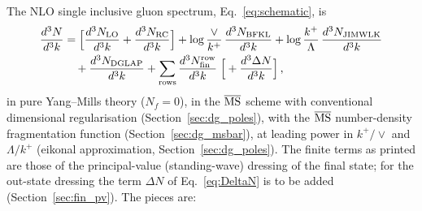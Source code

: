The NLO single inclusive gluon spectrum, Eq.~\eqref{eq:schematic}, is
\begin{align}\label{eq:result}
\frac{d^3N}{d^3k}&=\Big[\frac{d^3N_{\rm LO}}{d^3k}+\frac{d^3N_{\rm RC}}{d^3k}\Big]+\log\frac{\vee}{k^+}\,\frac{d^3N_{\rm BFKL}}{d^3k}+\log\frac{k^+}{\Lambda}\,\frac{d^3N_{\rm JIMWLK}}{d^3k}\notag\\
&\quad+\frac{d^3N_{\rm DGLAP}}{d^3k}+\sum_{\rm rows}\frac{d^3N^{\rm row}_{\rm fin}}{d^3k}\;\Big[+\frac{d^3\Delta N}{d^3k}\Big]\,,
\end{align}
in pure Yang--Mills theory ($N_f=0$), in the $\overline{\rm MS}$ scheme with conventional dimensional regularisation (Section~\ref{sec:dg_poles}), with the $\overline{\rm MS}$ number-density fragmentation function (Section~\ref{sec:dg_msbar}), at leading power in $k^+/\vee$ and $\Lambda/k^+$ (eikonal approximation, Section~\ref{sec:dg_poles}). The finite terms as printed are those of the principal-value (standing-wave) dressing of the final state; for the out-state dressing the term $\Delta N$ of Eq.~\eqref{eq:DeltaN} is to be added (Section~\ref{sec:fin_pv}). The pieces are:
